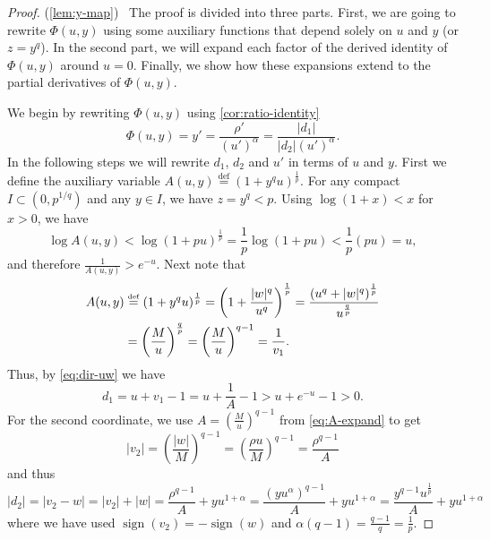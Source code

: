 \documentclass[10pt,a4paper]{amsart}
\newcommand{\defi}{\stackrel{\mathrm{\scriptscriptstyle def}}{=}}
\newcommand\linkofproof[1]{(\cref{#1})\newtarget{proof:#1}\ }
\newcommand{\newtarget}[1]{\hypertarget{#1}{}}
\DeclareMathOperator{\sign}{sign}
\begin{document}
\begin{proof}\linkofproof{lem:y-map}
    The proof is divided into three parts.
    First, we are going to rewrite $\Phi(u,y)$ using some auxiliary functions that depend solely on $u$ and $y$ (or $z = y^q$).
    In the second part, we will expand each factor of the derived identity of $\Phi(u,y)$ around $u=0$.
    Finally, we show how these expansions extend to the partial derivatives of $\Phi(u,y)$.

    We begin by rewriting $\Phi(u,y)$ using \cref{cor:ratio-identity}
    \begin{equation}\label{eq:yprime-ratio}
        \Phi(u,y)= y'
        = \frac{\rho'}{(u')^\alpha}
        = \frac{|d_1|}{|d_2|(u')^\alpha}.
    \end{equation}
    In the following steps we will rewrite $d_1$, $d_2$ and $u'$ in terms of $u$ and $y$.
    First we define the auxiliary variable $A(u,y)\defi (1+y^q u)^{\frac1p}$.
    For any compact $I \subset (0,p^{1/q})$ and any $y \in I$, we have $z = y^q < p$.
    Using $\log(1+x) < x$ for $x > 0$, we have
    \[
        \log A(u,y) < \log (1+p u)^{\frac1p} = \frac1p \log (1+p u) < \frac1p (p u) = u,
    \]
    and therefore $\frac{1}{A(u,y)} > e^{-u}$.
    Next note that
    \begin{align}
        \label{eq:A-expand}
        A(u,y)&\defi (1+y^q u)^{\frac1p}
        = \left( 1 + \frac{|w|^q}{u^q}\right)^{\frac1p}
        =\frac{\left(u^q + |w|^q\right)^{\frac1p}}{u^{\frac qp}} \notag\\
        &= \left(\frac{M}{u}\right)^{\frac qp} = \left(\frac{M}{u}\right)^{q-1} = \frac{1}{v_1}.
    \end{align}
    Thus, by \eqref{eq:dir-uw} we have
    \begin{equation}
        \label{eq:d1-expand}
        d_1 = u + v_1 - 1 = u + \frac{1}{A} - 1 > u + e^{-u} - 1 > 0.
    \end{equation}
    For the second coordinate, we use $A = \left( \frac{M}{u}\right)^{q-1}$ from \eqref{eq:A-expand} to get
    \[
        |v_2| = \left(\frac{|w|}{M}\right)^{q-1} = \left(\frac{\rho u}{M}\right)^{q-1} = \frac{\rho^{q-1}}{A}
    \]
    and thus
    \begin{equation}
        \label{eq:d2-abs-expand}
        |d_2| = |v_2 - w|
        = |v_2|+|w|
        = \frac{\rho^{q-1}}{A} + y u^{1+\alpha}
        = \frac{(y u^\alpha)^{q-1}}{A} + y u^{1+\alpha}
        = \frac{y^{q-1}u^{\frac 1p}}{A} + y u^{1+\alpha}
    \end{equation}
    where we have used $\sign(v_2) = -\sign(w)$ and $\alpha(q-1)=\frac{q-1}{q}=\frac{1}{p}$.

\end{proof}
\end{document}
